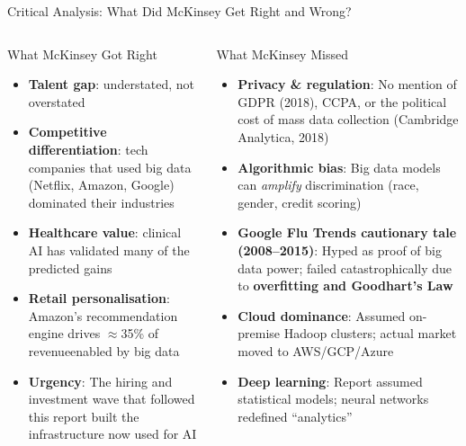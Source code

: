 \documentclass[aspectratio=169,10pt]{beamer}
\begin{document}
\begin{frame}{Critical Analysis: What Did McKinsey Get Right and Wrong?}
  \begin{columns}[T]
      \begin{exampleblock}{What McKinsey Got Right \checkmark}
        \begin{itemize}
          \item \textbf{Talent gap}: understated, not overstated
          \item \textbf{Competitive differentiation}: tech companies that used big data (Netflix, Amazon, Google) dominated their industries
          \item \textbf{Healthcare value}: clinical AI has validated many of the predicted gains
          \item \textbf{Retail personalisation}: Amazon's recommendation engine drives $\approx$35\% of revenue\textemdash enabled by big data
          \item \textbf{Urgency}: The hiring and investment wave that followed this report built the infrastructure now used for AI
        \end{itemize}
      \end{exampleblock}

      \begin{alertblock}{What McKinsey Missed \texttimes}
        \begin{itemize}
          \item \textbf{Privacy \& regulation}: No mention of GDPR (2018), CCPA, or the political cost of mass data collection (Cambridge Analytica, 2018)
          \item \textbf{Algorithmic bias}: Big data models can \emph{amplify} discrimination (race, gender, credit scoring)
          \item \textbf{Google Flu Trends cautionary tale (2008--2015)}: Hyped as proof of big data power; failed catastrophically due to \textbf{overfitting and Goodhart's Law}
          \item \textbf{Cloud dominance}: Assumed on-premise Hadoop clusters; actual market moved to AWS/GCP/Azure
          \item \textbf{Deep learning}: Report assumed statistical models; neural networks redefined ``analytics''
        \end{itemize}
      \end{alertblock}
  \end{columns}
\end{frame}
\end{document}
